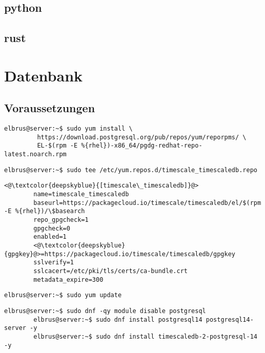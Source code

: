 \documentclass{article}
\begin{document}
	\subsection{python}
	\subsection{rust}
	\newpage

	\section{Datenbank}
	\subsection[dependencies]{Voraussetzungen}
	\lstset{style=commands}
	\begin{lstlisting}[caption={Hinzufügen des PostgreSQL Drittanbieter-Repository, um die neuesten PostgreSQL-Pakete zu erhalten.}]
		elbrus@server:~$ sudo yum install \
		 https://download.postgresql.org/pub/repos/yum/reporpms/ \
		 EL-$(rpm -E %{rhel})-x86_64/pgdg-redhat-repo-latest.noarch.rpm
	\end{lstlisting}
	
	\begin{lstlisting}[caption={Erstellen des Timescale repository.}]
		elbrus@server:~$ sudo tee /etc/yum.repos.d/timescale_timescaledb.repo
	\end{lstlisting}

	\lstset{style=files}
	\begin{lstlisting}[caption={Berarbeiten des Timescale repository.},keywords={name, baseurl, repo\_gpgcheck, enabled, sslverify, sslcacert, metadata\_expire}, keywordstyle=\color{deepskyblue}]
		<@\textcolor{deepskyblue}{[timescale\_timescaledb]}@>
		name=timescale_timescaledb
		baseurl=https://packagecloud.io/timescale/timescaledb/el/$(rpm -E %{rhel})/\$basearch
		repo_gpgcheck=1
		gpgcheck=0
		enabled=1
		<@\textcolor{deepskyblue}{gpgkey}@>=https://packagecloud.io/timescale/timescaledb/gpgkey
		sslverify=1
		sslcacert=/etc/pki/tls/certs/ca-bundle.crt
		metadata_expire=300
	\end{lstlisting}

	\lstset{style=commands}
	\begin{lstlisting}[caption={Updaten der lokalen Package-Liste.}]
		elbrus@server:~$ sudo yum update
	\end{lstlisting}

	\begin{lstlisting}[caption={Installieren von TimescaleDB}]
		elbrus@server:~$ sudo dnf -qy module disable postgresql
		elbrus@server:~$ sudo dnf install postgresql14 postgresql14-server -y
		elbrus@server:~$ sudo dnf install timescaledb-2-postgresql-14 -y
	\end{lstlisting}
	
\end{document}

